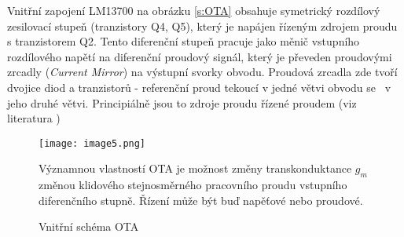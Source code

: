 \noindent Vnitřní zapojení LM13700 na obrázku \ref{s:OTA} obsahuje symetrický rozdílový zesilovací stupeň (tranzistory Q4, Q5), který je napájen řízeným zdrojem proudu s tranzistorem Q2. Tento diferenční stupeň pracuje jako měnič vstupního rozdílového napětí na diferenční proudový signál, který je převeden proudovými zrcadly (\textit{Current Mirror}) na výstupní svorky obvodu. Proudová zrcadla zde tvoří dvojice diod a tranzistorů - referenční proud tekoucí v jedné větvi obvodu se  ~v jeho druhé větvi. Principiálně jsou to zdroje proudu řízené proudem (viz literatura \cite{20})
\begin{figure}[h]
\centering
\texttt{[image: image5.png]}
\caption[Vnitřní schéma OTA]{Vnitřní schéma OTA \cite{17}\label{sec:OTA}}
\noindent Významnou vlastností OTA je možnost změny transkonduktance $g_m$ změnou klidového stejnosměrného pracovního proudu vstupního diferenčního stupně. Řízení může být buď napěťové nebo proudové.
\end{figure}
